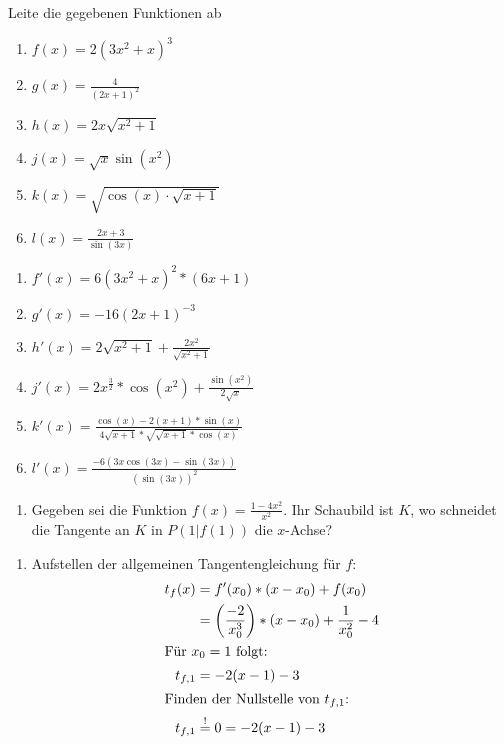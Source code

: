  Leite die gegebenen Funktionen ab
\begin{multicols}{3}
  \begin{enumerate}
    \item $f(x) = 2(3x^2+x)^3$
    \item $g(x) = \frac{4}{(2x+1)^2}$
    \item $h(x) = 2x\sqrt{x^2+1}$
    \item $j(x) = \sqrt{x}\sin(x^2)$
    \item $k(x) = \sqrt{\cos(x)\cdot\sqrt{x+1}}$
    \item $l(x) = \frac{2x+3}{\sin(3x)}$
  \end{enumerate}
\end{multicols}
\begin{lsg}{}
	\begin{enumerate}
    \item $f'(x) = 6(3x^2+x)^2*(6x+1)$
    \item $g'(x) = -16(2x+1)^{-3}$
    \item $h'(x) = 2\sqrt{x^2+1}+\frac{2x^2}{\sqrt{x^2+1}}$
    \item $j'(x) = 2x^{\frac 3 2}*\cos(x^2)+\frac{\sin(x^2)}{2\sqrt x}$
    \item $k'(x) = \frac{\cos(x)-2(x+1)*\sin(x)}{4\sqrt{x+1}*\sqrt{\sqrt{x+1}*\cos(x)}}$
    \item $l'(x) = \frac{-6\left(3x\cos(3x)-\sin(3x)\right)}{\left(\sin(3x)\right)^2}$
  \end{enumerate}
\end{lsg}


\aufgabe{}


  \begin{enumerate}
    \item Gegeben sei die Funktion $f(x) = \frac{1-4x^2}{x^2}$. Ihr Schaubild ist $K$, wo schneidet die Tangente an $K$ in $P(1|f(1))$ die $x$-Achse?
  \end{enumerate}
	\begin{lsg}{}
		\begin{enumerate}
			\item Aufstellen der allgemeinen Tangentengleichung für $f$:
			\begin{align*}
				t_f(x)&=f'(x_0)*(x-x_0)+f(x_0)\\
							&=\left(\frac{-2}{x_0^3}\right)*(x-x_0)+\frac{1}{x_0^2}-4\\
				\intertext{Für $x_0=1$ folgt:}
				t_{f,1}&=-2(x-1)-3\\
				\intertext{Finden der Nullstelle von $t_{f,1}$:}
				t_{f,1}&\overset!=0=-2(x-1)-3\\
			\end{align*}
		\end{enumerate}
	\end{lsg}



